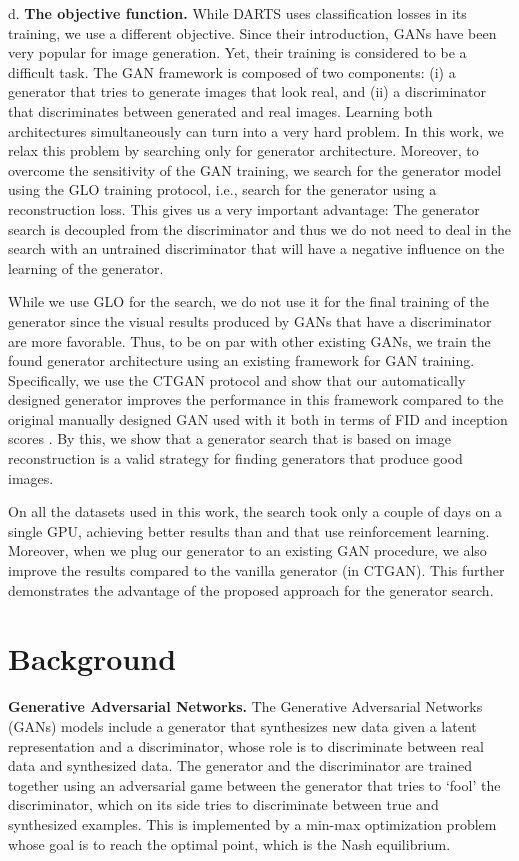 \documentclass[10pt,twocolumn,letterpaper]{article}
\begin{document}
d. {\bf The objective function.} While DARTS uses classification losses in its training, we use a different objective. Since their introduction, GANs have been very popular for image generation. Yet, their training is considered to be a difficult task. The GAN framework is composed of two components: (i) a generator that tries to generate images that look real, and (ii) a discriminator that discriminates between generated and real images. Learning both architectures simultaneously can turn into a very hard problem. In this work, we relax this problem by searching only for generator architecture. Moreover, to overcome the sensitivity of the GAN training, we search for the generator model using the GLO training protocol, i.e., search for the generator using a reconstruction loss. This gives us a very important advantage: The generator search is decoupled from the discriminator and thus we do not need to deal in the search with an untrained discriminator that will have a negative influence on the learning of the generator.

While we use GLO for the search, we do not use it for the final training of the generator since the visual results produced by GANs that have a discriminator are more favorable. Thus, to be on par with other existing GANs, we train the found generator architecture using an existing framework for GAN training. Specifically, we use the CTGAN protocol \cite{ctagn} and show that our automatically designed generator improves the performance in this framework compared to the original manually designed GAN used with it both in terms of FID \cite{fid} and inception scores \cite{IS}.
By this, we show that a generator search that is based on image reconstruction is a valid strategy for finding generators that produce good images.

On all the datasets used in this work, the search took only a couple of days on a single GPU, achieving better results than \cite{agan} and \cite{Autogan} that use reinforcement learning. Moreover, when we plug our generator to an existing GAN procedure, we also improve the results compared to the vanilla generator (in CTGAN).
This further demonstrates the advantage of the proposed approach for the generator search. 

\section{Background}
\label{Background}
{\bf Generative Adversarial Networks.}
The Generative Adversarial Networks (GANs) models \cite{gan} include a generator that synthesizes new data given a latent representation and
a discriminator, whose role is to discriminate between real data and synthesized data. The generator
and the discriminator are trained together using an adversarial game between the generator that tries to ‘fool’ the discriminator, which on its side tries to discriminate between true and synthesized examples. This is implemented by a min-max optimization problem whose goal is to reach the optimal point, which is the Nash equilibrium.
\end{document}
